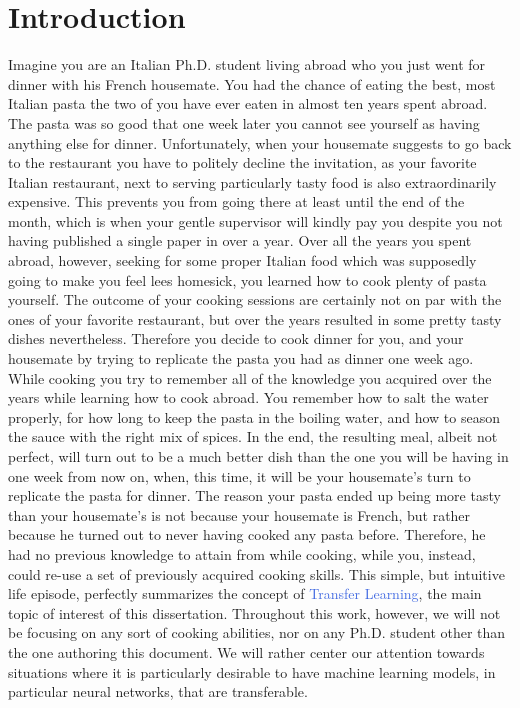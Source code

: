 \section{Introduction}
\label{sec:tl_introduction}
Imagine you are an Italian Ph.D. student living abroad who you just went for dinner with his French housemate. You had the chance of eating the best, most Italian pasta the two of you have ever eaten in almost ten years spent abroad. The pasta was so good that one week later you cannot see yourself as having anything else for dinner. Unfortunately, when your housemate suggests to go back to the restaurant you have to politely decline the invitation, as your favorite Italian restaurant, next to serving particularly tasty food is also extraordinarily expensive. This prevents you from going there at least until the end of the month, which is when your gentle supervisor will kindly pay you despite you not having published a single paper in over a year. Over all the years you spent abroad, however, seeking for some proper Italian food which was supposedly going to make you feel lees homesick, you learned how to cook plenty of pasta yourself. The outcome of your cooking sessions are certainly not on par with the ones of your favorite restaurant, but over the years resulted in some pretty tasty dishes nevertheless. Therefore you decide to cook dinner for you, and your housemate by trying to replicate the pasta you had as dinner one week ago. While cooking you try to remember all of the knowledge you acquired over the years while learning how to cook abroad. You remember how to salt the water properly, for how long to keep the pasta in the boiling water, and how to season the sauce with the right mix of spices. In the end, the resulting meal, albeit not perfect, will turn out to be a much better dish than the one you will be having in one week from now on, when, this time, it will be your housemate's turn to replicate the pasta for dinner. The reason your pasta ended up being more tasty than your housemate's is not because your housemate is French, but rather because he turned out to never having cooked any pasta before. Therefore, he had no previous knowledge to attain from while cooking, while you, instead, could re-use a set of previously acquired cooking skills. This simple, but intuitive life episode, perfectly summarizes the concept of \textcolor{RoyalBlue}{Transfer Learning}, the main topic of interest of this dissertation. Throughout this work, however, we will not be focusing on any sort of cooking abilities, nor on any Ph.D. student other than the one authoring this document. We will rather center our attention towards situations where it is particularly desirable to have machine learning models, in particular neural networks, that are transferable. 

